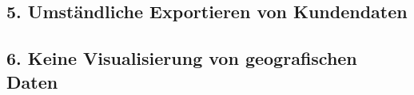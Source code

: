 \documentclass[Bachelorarbeit.tex]{subfiles}
\begin{document}
\subsection*{5. Umständliche Exportieren von Kundendaten}
\label{p5}
\subsection*{6. Keine Visualisierung von geografischen Daten}
\label{p6}

\end{document}
